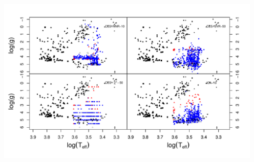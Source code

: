 \begin {figure*}
 \centering
  \includegraphics[width=\textwidth]{figs/ipac-Cesseti.pdf}
  \caption{}
 \label{fig:ipac-ces}
\end {figure*}



